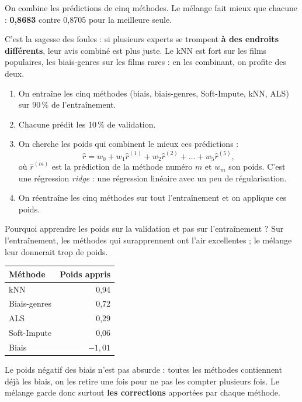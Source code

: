 \documentclass[11pt,a4paper]{article}
\newcommand{\rhat}{\hat r}
\begin{document}
\begin{enbref}
On combine les prédictions de cinq méthodes. Le mélange fait mieux que chacune :
\textbf{0,8683} contre 0,8705 pour la meilleure seule.
\end{enbref}

C'est la sagesse des foules : si plusieurs experts se trompent \textbf{à des endroits
différents}, leur avis combiné est plus juste. Le kNN est fort sur les films populaires,
les biais-genres sur les films rares : en les combinant, on profite des deux.

\begin{enumerate}
  \item On entraîne les cinq méthodes (biais, biais-genres, Soft-Impute, kNN, ALS) sur
        90\,\% de l'entraînement.
  \item Chacune prédit les 10\,\% de validation.
  \item On cherche les poids qui combinent le mieux ces prédictions :
        \[ \rhat = w_0 + w_1 \rhat^{(1)} + w_2 \rhat^{(2)} + \dots + w_5 \rhat^{(5)} , \]
        où $\rhat^{(m)}$ est la prédiction de la méthode numéro $m$ et $w_m$ son poids.
        C'est une régression \emph{ridge} : une régression linéaire avec un peu de
        régularisation.
  \item On réentraîne les cinq méthodes sur tout l'entraînement et on applique ces poids.
\end{enumerate}

Pourquoi apprendre les poids sur la validation et pas sur l'entraînement ? Sur
l'entraînement, les méthodes qui surapprennent ont l'air excellentes ; le mélange leur
donnerait trop de poids.

\begin{center}
\begin{tabular}{lr}
\toprule
\textbf{Méthode} & \textbf{Poids appris} \\
\midrule
kNN & 0,94 \\
Biais-genres & 0,72 \\
ALS & 0,29 \\
Soft-Impute & 0,06 \\
Biais & $-1{,}01$ \\
\bottomrule
\end{tabular}
\end{center}

Le poids négatif des biais n'est pas absurde : toutes les méthodes contiennent déjà les
biais, on les retire une fois pour ne pas les compter plusieurs fois. Le mélange garde
donc surtout \textbf{les corrections} apportées par chaque méthode.
\end{document}
